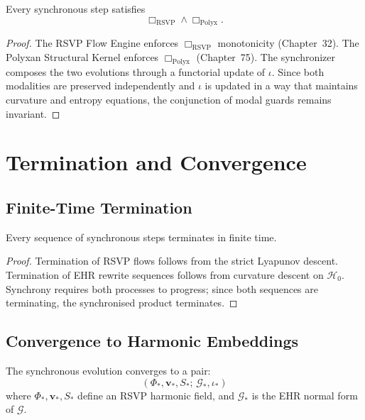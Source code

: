 \begin{theorem}
\label{thm:modal_sync}
Every synchronous step satisfies
\[
\Box_{\mathrm{RSVP}} \wedge \Box_{\mathrm{Polyx}}.
\]
\end{theorem}

\begin{proof}
The RSVP Flow Engine enforces $\Box_{\mathrm{RSVP}}$ monotonicity
(Chapter~32).  
The Polyxan Structural Kernel enforces $\Box_{\mathrm{Polyx}}$
(Chapter~75).  
The synchronizer composes the two evolutions through a functorial update of
$\iota$.  
Since both modalities are preserved independently and $\iota$ is updated in a
way that maintains curvature and entropy equations, the conjunction of modal
guards remains invariant.
\end{proof}

\section{Termination and Convergence}

\subsection{Finite-Time Termination}

\begin{theorem}
Every sequence of synchronous steps terminates in finite time.
\end{theorem}

\begin{proof}
Termination of RSVP flows follows from the strict Lyapunov descent.
Termination of EHR rewrite sequences follows from curvature descent on
$\mathcal{H}_0$.  
Synchrony requires both processes to progress; since both sequences are
terminating, the synchronised product terminates.
\end{proof}

\subsection{Convergence to Harmonic Embeddings}

\begin{theorem}
The synchronous evolution converges to a pair:
\[
(\Phi_\ast,\mathbf{v}_\ast,S_\ast;\, \mathcal{G}_\ast,\iota_\ast)
\]
where $\Phi_\ast,\mathbf{v}_\ast,S_\ast$ define an RSVP harmonic field, and
$\mathcal{G}_\ast$ is the EHR normal form of $\mathcal{G}$.
\end{theorem}

